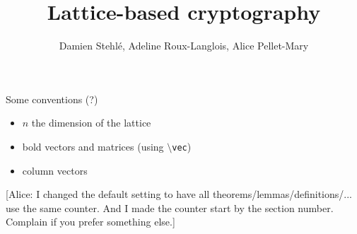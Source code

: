 \documentclass[a4paper,11pt]{article}
\title{Lattice-based cryptography}
\author{Damien Stehlé, Adeline Roux-Langlois, Alice Pellet-Mary}
\theoremstyle{definition}
\begin{document}
\maketitle

Some conventions (?)
\begin{itemize}
\item $n$ the dimension of the lattice
\item bold vectors and matrices (using \texttt{$\setminus$vec})
\item column vectors
\end{itemize}

{\color{red} [Alice: I changed the default setting to have all theorems/lemmas/definitions/... use the same counter. And I made the counter start by the section number. Complain if you prefer something else.]}

\tableofcontents







\end{document}
